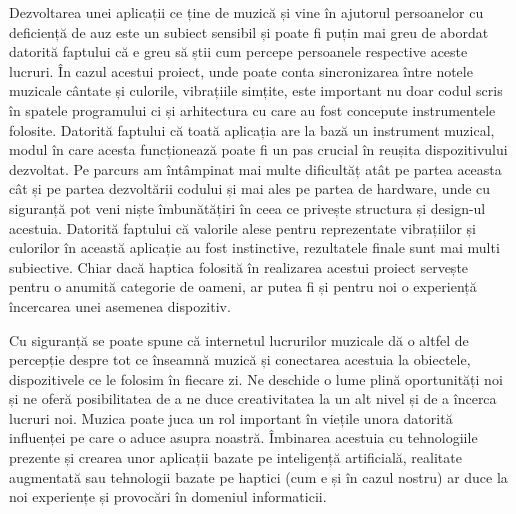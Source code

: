 Dezvoltarea unei aplicații ce ține de muzică și vine în ajutorul persoanelor cu deficiență de auz este un subiect sensibil și poate fi puțin mai greu de abordat datorită faptului că e greu să știi cum percepe persoanele respective aceste lucruri. În cazul acestui proiect, unde poate conta  sincronizarea între notele muzicale cântate și culorile, vibrațiile simțite, este important nu doar codul scris în spatele programului ci și arhitectura cu care au fost concepute instrumentele folosite. Datorită faptului că toată aplicația are la bază un instrument muzical, modul în care acesta funcționează poate fi un pas crucial în reușita dispozitivului dezvoltat. Pe parcurs am întâmpinat mai multe dificultăț atât pe partea aceasta cât și pe partea dezvoltării codului și mai ales pe partea de hardware, unde cu siguranță pot veni niște îmbunătățiri în ceea ce privește structura și design-ul acestuia. Datorită faptului că va\-lo\-ri\-le alese pentru reprezentate vibrațiilor și culorilor în această aplicație au fost instinctive, rezultatele finale sunt mai multi subiective. Chiar dacă haptica folosită în realizarea acestui proiect servește pentru o anumită categorie de oameni, ar putea fi și pentru noi o experiență încercarea unei asemenea dispozitiv.
\\
\par Cu siguranță se poate spune că internetul lucrurilor muzicale dă o altfel de percepție despre tot ce înseamnă muzică și conectarea acestuia la obiectele, dispozitivele ce le folosim în fiecare zi. Ne deschide o lume plină oportunități noi și ne oferă posibilitatea de a ne duce creativitatea la un alt nivel și de a încerca lucruri noi. Muzica poate juca un rol important în viețile unora datorită influenței pe care o aduce asupra noastră. Îmbinarea acestuia cu tehnologiile prezente și crearea unor aplicații bazate pe inteligență artificială, realitate augmentată sau tehnologii bazate pe haptici (cum e și în cazul nostru) ar duce la noi experiențe și provocări în domeniul informaticii.
